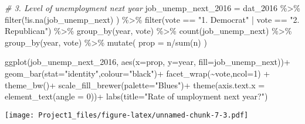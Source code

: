 \documentclass[
]{article}
\newenvironment{Shaded}{\begin{snugshade}}{\end{snugshade}}
\newcommand{\AttributeTok}[1]{\textcolor[rgb]{0.77,0.63,0.00}{#1}}
\newcommand{\CommentTok}[1]{\textcolor[rgb]{0.56,0.35,0.01}{\textit{#1}}}
\newcommand{\DecValTok}[1]{\textcolor[rgb]{0.00,0.00,0.81}{#1}}
\newcommand{\FunctionTok}[1]{\textcolor[rgb]{0.00,0.00,0.00}{#1}}
\newcommand{\NormalTok}[1]{#1}
\newcommand{\OtherTok}[1]{\textcolor[rgb]{0.56,0.35,0.01}{#1}}
\newcommand{\SpecialCharTok}[1]{\textcolor[rgb]{0.00,0.00,0.00}{#1}}
\newcommand{\StringTok}[1]{\textcolor[rgb]{0.31,0.60,0.02}{#1}}
\begin{document}
\begin{Shaded}
\begin{Highlighting}[]
\CommentTok{\# 3. Level of unemployment next year}
\NormalTok{job\_unemp\_next\_2016 }\OtherTok{=}\NormalTok{ dat\_2016 }\SpecialCharTok{\%\textgreater{}\%}
  \FunctionTok{filter}\NormalTok{(}\SpecialCharTok{!}\FunctionTok{is.na}\NormalTok{(job\_unemp\_next) ) }\SpecialCharTok{\%\textgreater{}\%}
  \FunctionTok{filter}\NormalTok{(vote }\SpecialCharTok{==} \StringTok{"1. Democrat"} \SpecialCharTok{|}\NormalTok{ vote }\SpecialCharTok{==} \StringTok{"2. Republican"}\NormalTok{) }\SpecialCharTok{\%\textgreater{}\%}
  \FunctionTok{group\_by}\NormalTok{(year, vote) }\SpecialCharTok{\%\textgreater{}\%}
  \FunctionTok{count}\NormalTok{(job\_unemp\_next) }\SpecialCharTok{\%\textgreater{}\%}
  \FunctionTok{group\_by}\NormalTok{(year, vote) }\SpecialCharTok{\%\textgreater{}\%}
  \FunctionTok{mutate}\NormalTok{(}
    \AttributeTok{prop =}\NormalTok{ n}\SpecialCharTok{/}\FunctionTok{sum}\NormalTok{(n)}
\NormalTok{  )}

\FunctionTok{ggplot}\NormalTok{(job\_unemp\_next\_2016,}
       \FunctionTok{aes}\NormalTok{(}\AttributeTok{x=}\NormalTok{prop, }\AttributeTok{y=}\NormalTok{year, }\AttributeTok{fill=}\NormalTok{job\_unemp\_next))}\SpecialCharTok{+}
  \FunctionTok{geom\_bar}\NormalTok{(}\AttributeTok{stat=}\StringTok{"identity"}\NormalTok{,}\AttributeTok{colour=}\StringTok{"black"}\NormalTok{)}\SpecialCharTok{+}
  \FunctionTok{facet\_wrap}\NormalTok{(}\SpecialCharTok{\textasciitilde{}}\NormalTok{vote,}\AttributeTok{ncol=}\DecValTok{1}\NormalTok{) }\SpecialCharTok{+}
  \FunctionTok{theme\_bw}\NormalTok{()}\SpecialCharTok{+}
  \FunctionTok{scale\_fill\_brewer}\NormalTok{(}\AttributeTok{palette=}\StringTok{"Blues"}\NormalTok{)}\SpecialCharTok{+}
  \FunctionTok{theme}\NormalTok{(}\AttributeTok{axis.text.x =} \FunctionTok{element\_text}\NormalTok{(}\AttributeTok{angle =} \DecValTok{0}\NormalTok{))}\SpecialCharTok{+}
  \FunctionTok{labs}\NormalTok{(}\AttributeTok{title=}\StringTok{"Rate of umployment next year?"}\NormalTok{)}
\end{Highlighting}
\end{Shaded}

\texttt{[image: Project1\_files/figure-latex/unnamed-chunk-7-3.pdf]}
\end{document}
